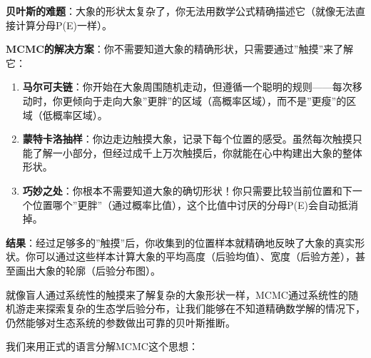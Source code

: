 \documentclass[
  twoside]{book}
\begin{document}
\textbf{贝叶斯的难题}：大象的形状太复杂了，你无法用数学公式精确描述它（就像无法直接计算分母P(E)一样）。

\textbf{MCMC的解决方案}：你不需要知道大象的精确形状，只需要通过''触摸''来了解它：

\begin{enumerate}
\def\labelenumi{\arabic{enumi}.}
\item
  \textbf{马尔可夫链}：你开始在大象周围随机走动，但遵循一个聪明的规则------每次移动时，你更倾向于走向大象''更胖''的区域（高概率区域），而不是''更瘦''的区域（低概率区域）。
\item
  \textbf{蒙特卡洛抽样}：你边走边触摸大象，记录下每个位置的感受。虽然每次触摸只能了解一小部分，但经过成千上万次触摸后，你就能在心中构建出大象的整体形状。
\item
  \textbf{巧妙之处}：你根本不需要知道大象的确切形状！你只需要比较当前位置和下一个位置哪个''更胖''（通过概率比值），这个比值中讨厌的分母P(E)会自动抵消掉。
\end{enumerate}

\textbf{结果}：经过足够多的''触摸''后，你收集到的位置样本就精确地反映了大象的真实形状。你可以通过这些样本计算大象的平均高度（后验均值）、宽度（后验方差），甚至画出大象的轮廓（后验分布图）。

就像盲人通过系统性的触摸来了解复杂的大象形状一样，MCMC通过系统性的随机游走来探索复杂的生态学后验分布，让我们能够在不知道精确数学解的情况下，仍然能够对生态系统的参数做出可靠的贝叶斯推断。

我们来用正式的语言分解MCMC这个思想：
\end{document}
